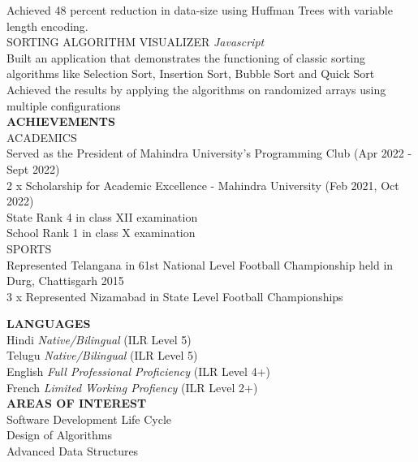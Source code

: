 \documentclass[a4paper, oneside, 12pt]{article}
\begin{document}
\begin{Parallel}{0.39\textwidth}{0.58\textwidth}
{		\noindent
		\textopenbullet \textsf{Achieved 48 percent reduction in data-size using Huffman Trees with variable length encoding.} \\

		\noindent
		\textsf{\textmd{SORTING ALGORITHM VISUALIZER} \hfill \textsl{Javascript}} \\

		\noindent
		\textopenbullet \textsf{Built an application that demonstrates the functioning of classic sorting algorithms like Selection Sort, Insertion Sort, Bubble Sort and Quick Sort} \\
		
		\noindent
		\textopenbullet \textsf{Achieved the results by applying the algorithms on randomized arrays using multiple configurations} \\
		    
		\noindent
		\textsf{{\large \textbf{ACHIEVEMENTS}}} \\
		\textsf{\textmd{ACADEMICS}} \\
		\textbullet \textsf{Served as the President of Mahindra University's Programming Club (Apr 2022 - Sept 2022)} \\
		\textbullet \textsf{2 x Scholarship for Academic Excellence - Mahindra University (Feb 2021, Oct 2022)} \\
		\textbullet \textsf{State Rank 4 in class XII examination} \\
		\textbullet \textsf{School Rank 1 in class X examination} \\
		
		\noindent
		\textsf{\textmd{SPORTS}} \\
		\textbullet \textsf{Represented Telangana in 61st National Level Football Championship held in Durg, Chattisgarh 2015} \\
		\textbullet \textsf{3 x Represented Nizamabad in State Level Football Championships}
		
		\noindent
		\textsf{{\large \textbf{LANGUAGES}}} \\
		\textsf{Hindi} \textsf{\textit{Native/Bilingual}} \textsf{(ILR Level 5)} \\
		\textsf{Telugu} \textsf{\textit{Native/Bilingual}} \textsf{(ILR Level 5)} \\
		\textsf{English} \textsf{\textit{Full Professional Proficiency}} \textsf{(ILR Level 4+)} \\
		\textsf{French} \textsf{\textit{Limited Working Profiency}} \textsf{(ILR Level 2+)} \\
		
		\noindent
		\textsf{{\large \textbf{AREAS OF INTEREST}}} \\
		\textsf{Software Development Life Cycle} \\
		\textsf{Design of Algorithms} \\
		\textsf{Advanced Data Structures} \\
	} 
	    
\end{Parallel}
\end{document}
